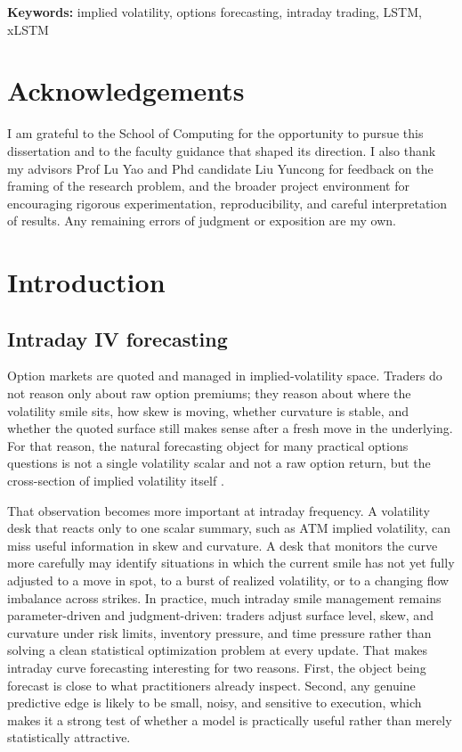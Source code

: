 \documentclass[12pt]{report}
\begin{document}
\noindent\textbf{Keywords:} implied volatility, options forecasting, intraday trading, LSTM, xLSTM

\cleardoublepage
\chapter*{Acknowledgements}
I am grateful to the School of Computing for the opportunity to pursue this dissertation and to the faculty guidance that shaped its direction. I also thank my advisors Prof Lu Yao and Phd candidate Liu Yuncong for feedback on the framing of the research problem, and the broader project environment for encouraging rigorous experimentation, reproducibility, and careful interpretation of results. Any remaining errors of judgment or exposition are my own.

\cleardoublepage
\begingroup
\setlength{\parskip}{0pt}
\setlength{\itemsep}{0pt}
\renewcommand{\baselinestretch}{0.95}

\tableofcontents
\endgroup

\cleardoublepage
\setcounter{page}{1}
\hypersetup{pageanchor=true}

\chapter{Introduction}

\section{Intraday IV forecasting}
Option markets are quoted and managed in implied-volatility space. Traders do not reason only about raw option premiums; they reason about where the volatility smile sits, how skew is moving, whether curvature is stable, and whether the quoted surface still makes sense after a fresh move in the underlying. For that reason, the natural forecasting object for many practical options questions is not a single volatility scalar and not a raw option return, but the cross-section of implied volatility itself \citep{black1973,dumas1998,cont2002dynamics}.

That observation becomes more important at intraday frequency. A volatility desk that reacts only to one scalar summary, such as ATM implied volatility, can miss useful information in skew and curvature. A desk that monitors the curve more carefully may identify situations in which the current smile has not yet fully adjusted to a move in spot, to a burst of realized volatility, or to a changing flow imbalance across strikes. In practice, much intraday smile management remains parameter-driven and judgment-driven: traders adjust surface level, skew, and curvature under risk limits, inventory pressure, and time pressure rather than solving a clean statistical optimization problem at every update. That makes intraday curve forecasting interesting for two reasons. First, the object being forecast is close to what practitioners already inspect. Second, any genuine predictive edge is likely to be small, noisy, and sensitive to execution, which makes it a strong test of whether a model is practically useful rather than merely statistically attractive.
\end{document}
